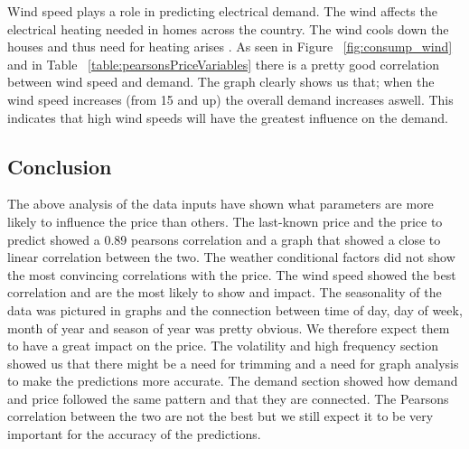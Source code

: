 Wind speed plays a role in predicting electrical demand. The wind affects the electrical heating needed in homes across the country. The wind cools down the houses and thus need for heating arises \cite{19}. As seen in Figure ~\ref{fig:consump_wind} and in Table ~\ref{table:pearsonsPriceVariables} there is a pretty good correlation between wind speed and demand. The graph clearly shows us that; when the wind speed increases (from 15 and up) the overall demand increases aswell. This indicates that high wind speeds will have the greatest influence on the demand.


\subsection{Conclusion}
The above analysis of the data inputs have shown what parameters are more likely to influence the price than others. The last-known price and the price to predict showed a 0.89 pearsons correlation and a graph that showed a close to linear correlation between the two. The weather conditional factors did not show the most convincing correlations with the price. The wind speed showed the best correlation and are the most likely to show and impact. The seasonality of the data was pictured in graphs and the connection between time of day, day of week, month of year and season of year was pretty obvious. We therefore expect them to have a great impact on the price. The volatility and high frequency section showed us that there might be a need for trimming and a need for graph analysis to make the predictions more accurate. The demand section showed how demand and price followed the same pattern and that they are connected. The Pearsons correlation between the two are not the best but we still expect it to be very important for the accuracy of the predictions.